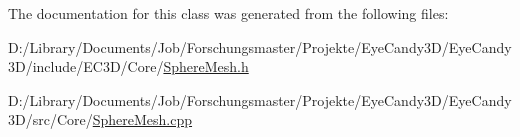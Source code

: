 The documentation for this class was generated from the following files\+:\begin{DoxyCompactItemize}
\item 
D\+:/\+Library/\+Documents/\+Job/\+Forschungsmaster/\+Projekte/\+Eye\+Candy3\+D/\+Eye\+Candy3\+D/include/\+E\+C3\+D/\+Core/\mbox{\hyperlink{_sphere_mesh_8h}{Sphere\+Mesh.\+h}}\item 
D\+:/\+Library/\+Documents/\+Job/\+Forschungsmaster/\+Projekte/\+Eye\+Candy3\+D/\+Eye\+Candy3\+D/src/\+Core/\mbox{\hyperlink{_sphere_mesh_8cpp}{Sphere\+Mesh.\+cpp}}\end{DoxyCompactItemize}
